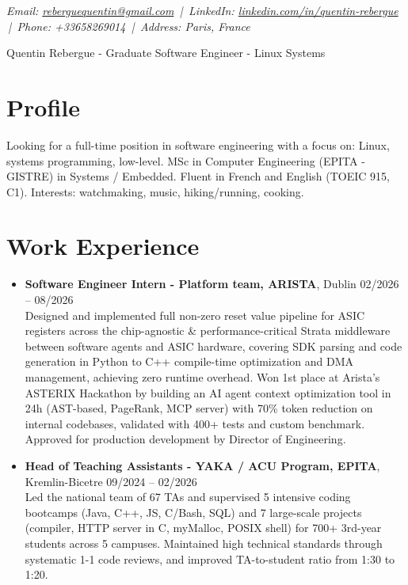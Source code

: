 \documentclass[9pt,a4paper]{article}
\newcommand{\namefont}{\fontsize{18}{22}\selectfont}
\newcommand{\tinyscript}{\fontsize{8}{8}\selectfont}
\begin{document}
\renewcommand\normalsize{\fontsize{10.5}{15}\selectfont}
\normalsize

\begin{center}
  {\tinyscript\itshape
  Email: \href{mailto:reberguequentin@gmail.com}{reberguequentin@gmail.com} \,|\,
  LinkedIn: \href{https://linkedin.com/in/quentin-rebergue}{linkedin.com/in/quentin-rebergue} \,|\,
  Phone: +33658269014 \,|\,
  Address: Paris, France}
\end{center}

\begin{center}
  {\namefont Quentin Rebergue - Graduate Software Engineer - Linux Systems}
\end{center}

\section*{Profile}
\begin{tcolorbox}[mybox2]
Looking for a full-time position in software engineering with a focus on: Linux, systems programming, low-level. MSc in Computer Engineering (EPITA - GISTRE) in Systems / Embedded. Fluent in French and English (TOEIC 915, C1). Interests: watchmaking, music, hiking/running, cooking.
\end{tcolorbox}

\section*{Work Experience}
\begin{tcolorbox}[mybox]
\begin{itemize}
\item\textbf{Software Engineer Intern - Platform team, ARISTA}, Dublin \hfill {\small02/2026 – 08/2026}\\[0.5em]
\textcolor{gray!40!black}{Designed and implemented full non-zero reset value pipeline for ASIC registers across the chip-agnostic \&
performance-critical Strata middleware between software agents and ASIC hardware, covering SDK parsing and code
generation in Python to C++ compile-time optimization and DMA management, achieving zero runtime overhead.
Won 1st place at Arista’s ASTERIX Hackathon by building an AI agent context optimization tool in 24h (AST-based,
PageRank, MCP server) with 70\% token reduction on internal codebases, validated with 400+ tests and custom benchmark. Approved for production development by Director of Engineering.}

\item\textbf{Head of Teaching Assistants - YAKA / ACU Program, EPITA}, Kremlin-Bicetre \hfill {\small09/2024 – 02/2026}\\[0.5em]
\textcolor{gray!40!black}{Led the national team of 67 TAs and supervised 5 intensive coding bootcamps (Java, C++, JS, C/Bash, SQL) and
7 large-scale projects (compiler, HTTP server in C, myMalloc, POSIX shell) for 700+ 3rd-year students across 5
campuses. Maintained high technical standards through systematic 1-1 code reviews, and improved TA-to-student
ratio from 1:30 to 1:20.}
\end{itemize}
\end{tcolorbox}
\end{document}
